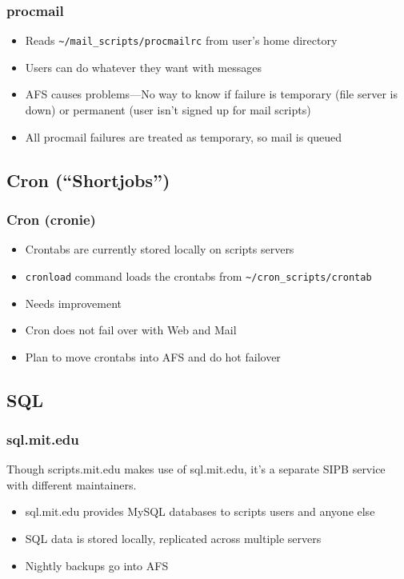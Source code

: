 \begin{frame}[fragile]
  \frametitle{procmail}
  \begin{itemize}
    \item Reads \verb|~/mail_scripts/procmailrc| from user's home directory
    \item Users can do whatever they want with messages
    \item AFS causes problems---No way to know if failure is temporary (file server is down) or permanent (user isn't signed up for mail scripts)
    \item All procmail failures are treated as temporary, so mail is queued
  \end{itemize}
\end{frame}

\subsection{Cron (``Shortjobs'')}

\begin{frame}[fragile]
  \frametitle{Cron (cronie)}
  \begin{itemize}
    \item Crontabs are currently stored locally on scripts servers
    \item {\tt cronload} command loads the crontabs from
      \verb|~/cron_scripts/crontab| \pause
    \item Needs improvement
    \item Cron does not fail over with Web and Mail
    \item Plan to move crontabs into AFS and do hot failover
  \end{itemize}
\end{frame}

\subsection{SQL}

\begin{frame}
  \frametitle{sql.mit.edu}
  Though scripts.mit.edu makes use of sql.mit.edu, it's a separate SIPB service with different maintainers.
\begin{itemize}
\item sql.mit.edu provides MySQL databases to scripts users and anyone else
\item SQL data is stored locally, replicated across multiple servers
\item Nightly backups go into AFS
\end{itemize}
\end{frame}

